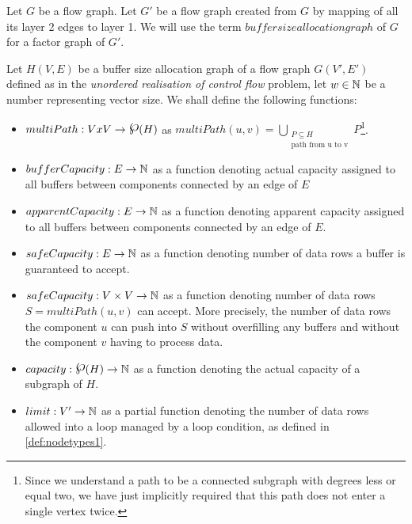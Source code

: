   Let $G$ be a flow graph. Let $G'$ be a flow graph created from $G$ by mapping of all its layer 2 edges to layer 1.
  We will use the term $buffer size allocation graph$ of $G$ for a factor graph of $G'$.
\myenddef


  Let $H(V,E)$ be a buffer size allocation graph of a flow graph $G(V',E')$ defined as in the \emph{unordered realisation of control flow} problem, let $w \in \mathbb{N}$ be a number representing vector size. We shall define the following functions:
  \begin{itemize}
    \item $multiPath: V x V \arrow \powerset (H)$ as $multiPath(u,v) = \bigcup_{\substack{P \subseteq H \\ \text{path from u to v}}} P$\footnote{Since we understand a path to be a connected subgraph with degrees less or equal two, we have just implicitly required that this path does not enter a single vertex twice.}.
    \item $bufferCapacity: E \rightarrow \mathbb{N}$ as a function denoting actual capacity assigned to all buffers between components connected by an edge of $E$ 
    \item $apparentCapacity: E \rightarrow \mathbb{N}$ as a function denoting apparent capacity assigned to all buffers between components connected by an edge of $E$.
    \item $safeCapacity: E \rightarrow \mathbb{N}$ as a function denoting number of data rows a buffer is guaranteed to accept.
    \item $safeCapacity: V \times V \rightarrow \mathbb{N}$ as a function denoting number of data rows $S = multiPath(u,v)$ can accept. More precisely, the number of data rows the component $u$ can push into $S$ without overfilling any buffers and without the component $v$ having to process data.
    \item $capacity: \powerset(H) \arrow \N$ as a function denoting the actual capacity of a subgraph of $H$.
    \item $limit: V' \rightarrow \mathbb{N}$ as a partial function denoting the number of data rows allowed into a loop managed by a loop condition, as defined in \ref{def:nodetypes1}.
  \end{itemize}


